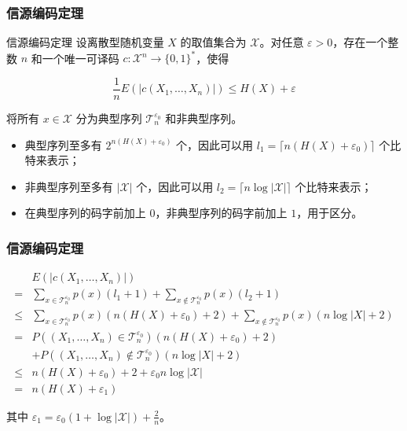 \documentclass{beamer}
\begin{document}
\begin{frame}
    \frametitle{信源编码定理}

    \begin{block}{信源编码定理}
        设离散型随机变量 $X$ 的取值集合为 $\mathcal{X}$。对任意 $\varepsilon > 0$，存在一个整数 $n$ 和一个唯一可译码 $c: \mathcal{X}^n \rightarrow \{0, 1\}^*$，使得

        \[\frac{1}{n}E(\lvert c(X_1, \dots, X_n)\rvert) \leq H(X) + \varepsilon\]
    \end{block}
    
    将所有 $x\in \mathcal{X}$ 分为典型序列 $\mathcal{T}_n^{\varepsilon_0}$ 和非典型序列。

    \begin{itemize}
        \item 典型序列至多有 $2^{n(H(X) + \varepsilon_0)}$ 个，因此可以用 $l_1 = \lceil n(H(X) + \varepsilon_0)\rceil$ 个比特来表示；
        \item 非典型序列至多有 $\lvert \mathcal{X}\rvert$ 个，因此可以用 $l_2 = \lceil n\log \lvert \mathcal{X}\rvert\rceil$ 个比特来表示；
        \item 在典型序列的码字前加上 $0$，非典型序列的码字前加上 $1$，用于区分。
    \end{itemize}

\end{frame}

\begin{frame}
    \frametitle{信源编码定理}

    \[\begin{split}
        & E(\lvert c(X_1, \dots, X_n)\rvert) \\
        = & \sum_{x\in\mathcal{T}_n^{\varepsilon_0}}p(x)(l_1 + 1) + \sum_{x\notin\mathcal{T}_n^{\varepsilon_0}}p(x)(l_2 + 1) \\
        \leq & \sum_{x\in\mathcal{T}_n^{\varepsilon_0}}p(x)(n(H(X) + \varepsilon_0) + 2) + \sum_{x\notin\mathcal{T}_n^{\varepsilon_0}}p(x)(n\log \lvert X\rvert + 2) \\
        = & P((X_1, \dots, X_n) \in \mathcal{T}_n^{\varepsilon_0})(n(H(X) + \varepsilon_0) + 2) \\
        & + P((X_1, \dots, X_n) \notin \mathcal{T}_n^{\varepsilon_0})(n\log \lvert X\rvert + 2) \\
        \leq & n(H(X) + \varepsilon_0) + 2 + \varepsilon_0 n\log\lvert\mathcal{X}\rvert \\
        = & n(H(X) + \varepsilon_1)
    \end{split}\]

    其中 $\varepsilon_1 = \varepsilon_0(1 + \log\lvert\mathcal{X}\rvert) + \frac{2}{n}$。

\end{frame}
\end{document}

